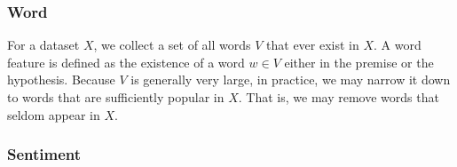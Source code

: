 \subsubsection{Word} 
For a dataset $X$, we collect a set of all words 
$V$ that ever exist in $X$. 
A word feature is defined as the existence of a word $w \in V$
either in the premise or the hypothesis. 
Because $V$ is generally very large, in practice, we may narrow it down
to words that are sufficiently popular in $X$. That is, we may remove
words that seldom appear in $X$.
%

%

\subsubsection{Sentiment}

